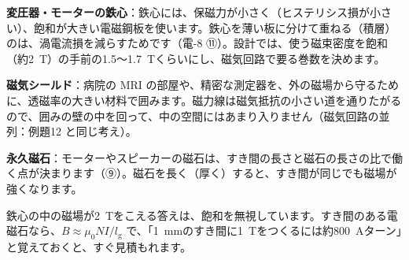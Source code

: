 \begin{phkougaku}[鉄心と磁石を選ぶ]
\textbf{変圧器・モーターの鉄心}：鉄心には、保磁力が小さく（ヒステリシス損が小さい）、飽和が大きい電磁鋼板を使います。鉄心を薄い板に分けて重ねる（積層）のは、渦電流損を減らすためです（電-8 ⑪）。設計では、使う磁束密度を飽和（約\qty{2}{T}）の手前の1.5〜\qty{1.7}{T}くらいにし、磁気回路で要る巻数を決めます。

\textbf{磁気シールド}：病院の MRI の部屋や、精密な測定器を、外の磁場から守るために、透磁率の大きい材料で囲みます。磁力線は磁気抵抗の小さい道を通りたがるので、囲みの壁の中を回って、中の空間にはあまり入りません（磁気回路の並列：例題12 と同じ考え）。

\textbf{永久磁石}：モーターやスピーカーの磁石は、すき間の長さと磁石の長さの比で働く点が決まります（⑨）。磁石を長く（厚く）すると、すき間が同じでも磁場が強くなります。

\begin{phketa}[磁性材料の数の目安]
鉄心の中の磁場が\qty{2}{T}をこえる答えは、飽和を無視しています。すき間のある電磁石なら、$B\approx\mu_0NI/l_{\mathrm g}$ で、「\qty{1}{mm}のすき間に\qty{1}{T}をつくるには約\qty{800}{A}ターン」と覚えておくと、すぐ見積もれます。
\end{phketa}
\end{phkougaku}

